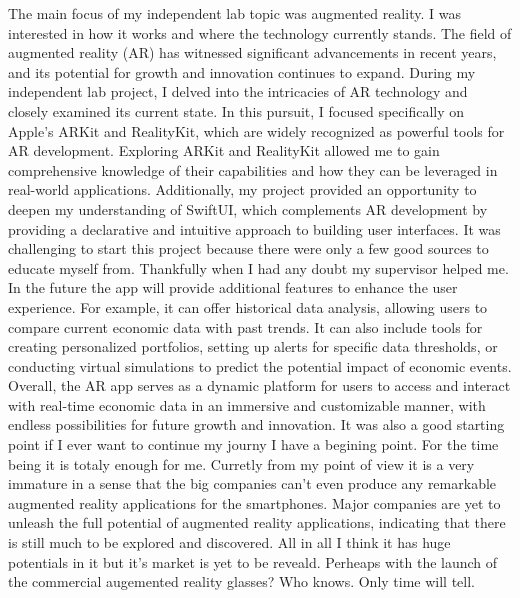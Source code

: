 \documentclass[a4paper,oneside]{article}
\begin{document}
The main focus of my independent lab topic was augmented reality. I was interested in how it works and where the technology currently stands.
The field of augmented reality (AR) has witnessed significant advancements in recent years, and its potential for growth and innovation continues to expand. During my independent lab project, I delved into the intricacies of AR technology and closely examined its current state. In this pursuit, I focused specifically on Apple's ARKit and RealityKit, which are widely recognized as powerful tools for AR development.
Exploring ARKit and RealityKit allowed me to gain comprehensive knowledge of their capabilities and how they can be leveraged in real-world applications. Additionally, my project provided an opportunity to deepen my understanding of SwiftUI, which complements AR development by providing a declarative and intuitive approach to building user interfaces.
\linebreak
It was challenging to start this project because there were only a few good sources to educate myself from. Thankfully when I had any doubt my supervisor helped me.
In the future the app will provide additional features to enhance the user experience.
For example, it can offer historical data analysis, allowing users to compare current economic data with past trends. It can also include tools for creating personalized portfolios, setting up alerts for specific data thresholds, or conducting virtual simulations to predict the potential impact of economic events.
\linebreak
Overall, the AR app serves as a dynamic platform for users to access and interact with real-time economic data in an immersive and customizable manner, with endless possibilities for future growth and innovation.
It was also a good starting point if I ever want to continue my journy I have a begining point. For the time being it is totaly enough for me.
\linebreak
Curretly from my point of view it is a very immature in a sense that the big companies can't even produce any remarkable augmented reality applications for the smartphones. Major companies are yet to unleash the full potential of augmented reality applications, indicating that there is still much to be explored and discovered. All in all I think it has huge potentials in it but it's market is yet to be reveald. Perheaps with the launch of the commercial augemented reality glasses? Who knows. Only time will tell.
\newpage

\end{document}
